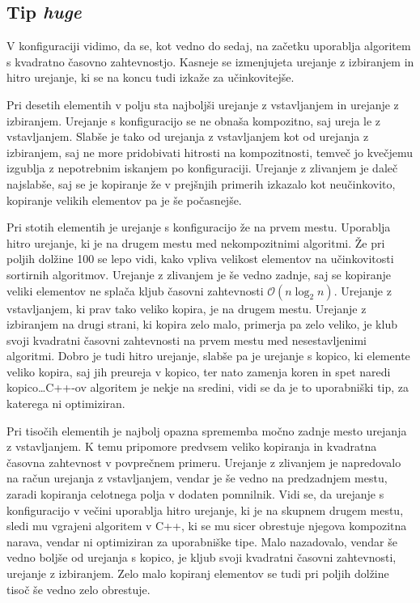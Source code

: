 \documentclass[a4paper,oneside,12pt]{article}
\begin{document}
\subsection{Tip \emph{huge}}
V konfiguraciji vidimo, da se, kot vedno do sedaj, na začetku uporablja algoritem s kvadratno
časovno zahtevnostjo. Kasneje se izmenjujeta urejanje z izbiranjem in hitro
urejanje, ki se na koncu tudi izkaže za učinkovitejše.

Pri desetih elementih v polju sta najboljši urejanje z vstavljanjem in urejanje
z izbiranjem. Urejanje s konfiguracijo se ne obnaša kompozitno, saj ureja le z
vstavljanjem. Slabše je tako od urejanja z vstavljanjem kot od urejanja z
izbiranjem, saj ne more pridobivati hitrosti na kompozitnosti, temveč jo
kvečjemu izgublja z nepotrebnim iskanjem po konfiguraciji. Urejanje z zlivanjem
je daleč najslabše, saj se je  kopiranje že v prejšnjih primerih izkazalo kot
neučinkovito, kopiranje velikih elementov pa je še počasnejše. 

Pri stotih elementih je urejanje s konfiguracijo že na prvem mestu. Uporablja
hitro urejanje, ki je na drugem mestu med nekompozitnimi algoritmi. Že pri
poljih dolžine 100 se lepo
vidi, kako vpliva velikost elementov na učinkovitosti sortirnih algoritmov.
Urejanje z zlivanjem je še vedno zadnje, saj se kopiranje veliki elementov ne
splača kljub časovni zahtevnosti $\mathcal{O}(n\log_2 n)$. Urejanje z
vstavljanjem, ki prav tako veliko kopira, je na drugem mestu. Urejanje z
izbiranjem na drugi strani, ki kopira zelo malo, primerja pa zelo veliko, je
klub svoji kvadratni časovni zahtevnosti na prvem mestu med nesestavljenimi
algoritmi. Dobro je tudi hitro urejanje, slabše pa je urejanje s kopico, ki
elemente veliko kopira, saj jih preureja v kopico, ter nato zamenja koren in spet
naredi kopico\dots C++-ov algoritem je nekje na sredini, vidi se da je to
uporabniški tip, za katerega ni optimiziran.

Pri tisočih elementih je najbolj opazna sprememba močno zadnje mesto urejanja z
vstavljanjem. K temu pripomore predvsem veliko kopiranja in kvadratna časovna
zahtevnost v povprečnem primeru. Urejanje z zlivanjem je napredovalo na račun
urejanja z vstavljanjem, vendar je še vedno na predzadnjem mestu, zaradi
kopiranja celotnega polja v dodaten pomnilnik. Vidi se, da urejanje s
konfiguracijo v večini uporablja hitro urejanje, ki je na skupnem drugem mestu, 
sledi mu vgrajeni algoritem v C++, ki se mu sicer obrestuje njegova kompozitna
narava, vendar ni optimiziran za uporabniške tipe. Malo nazadovalo, vendar še
vedno boljše od urejanja s kopico, je kljub svoji kvadratni časovni zahtevnosti,
urejanje z izbiranjem. Zelo malo kopiranj elementov se tudi pri poljih dolžine
tisoč še vedno zelo obrestuje.
\end{document}

